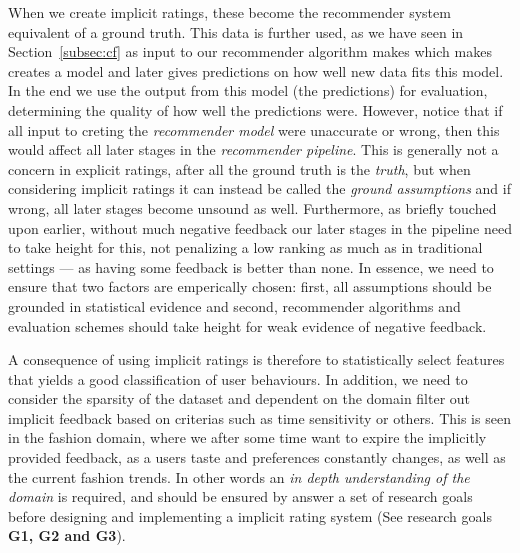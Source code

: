 When we create implicit ratings, these become the recommender system equivalent
of a ground truth. This data is further used, as we have seen in
Section~\ref{subsec:cf} as input to our recommender algorithm makes which makes
creates a model and later gives predictions on how well new data fits this
model. In the end we use the output from this model (the predictions) for
evaluation, determining the quality of how well the predictions were. However,
notice that if all input to creting the \textit{recommender model} were
unaccurate or wrong, then this would affect all later stages in the
\textit{recommender pipeline}. This is generally not a concern in explicit
ratings, after all the ground truth is the \textit{truth}, but when considering
implicit ratings it can instead be called the \textit{ground assumptions} and
if wrong, all later stages become unsound as well. Furthermore, as briefly
touched upon earlier, without much negative feedback our later stages in the
pipeline need to take height for this, not penalizing a low ranking as much as
in traditional settings --- as having some feedback is better than none. In
essence, we need to ensure that two factors are emperically chosen: first, all
assumptions should be grounded in statistical evidence and second, recommender
algorithms and evaluation schemes should take height for weak evidence of
negative feedback.

A consequence of using implicit ratings is therefore to statistically select
features that yields a good classification of user behaviours. In addition,
we need to consider the sparsity of the dataset and dependent on the domain
filter out implicit feedback based on criterias such as time sensitivity or
others. This is seen in the fashion domain, where we after some time want to
expire the implicitly provided feedback, as a users taste and preferences
constantly changes, as well as the current fashion trends. In other words an
\textit{in depth understanding of the domain} is required, and should be
ensured by answer a set of research goals before designing and implementing a
implicit rating system (See research goals \textbf{G1, G2 and G3}).
